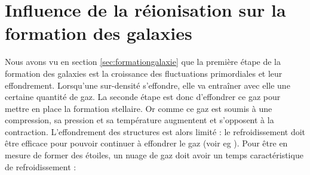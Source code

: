

%


%
%



\section{Influence de la réionisation sur la formation des galaxies}
\label{sec:refroidissement}

Nous avons vu en section \ref{sec:formationgalaxie} que la première étape de la formation des galaxies est la croissance des fluctuations primordiales et leur effondrement.
Lorsqu'une sur-densité s’effondre, elle va entraîner avec elle une certaine quantité de gaz.
La seconde étape est donc d’effondrer ce gaz pour mettre en place la formation stellaire.
Or comme ce gaz est soumis à une compression, sa pression et sa température augmentent et s'opposent à la contraction.
L'effondrement des structures est alors limité : le refroidissement doit être efficace pour pouvoir continuer à effondrer le gaz (voir eg \cite{2004ARA&A..42...79B}).
Pour être en mesure de former des étoiles, un nuage de gaz doit avoir un temps caractéristique de refroidissement :

